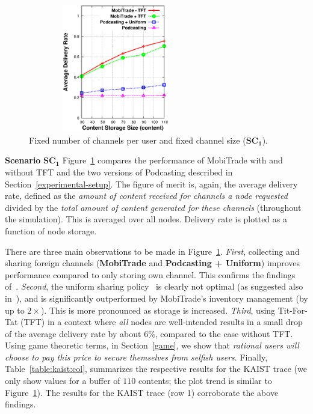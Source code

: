 \begin{figure}[!h]
  \begin{center}
    \includegraphics[width=3in,height=2.2in]{Chapitre5/fig5.eps}
  \end{center}
  \caption{Fixed number of channels per user and fixed channel size ($\mathbf{SC_1}$).}
  \label{CS+FNC+FCS}
\end{figure}

\textbf{Scenario} $\mathbf{SC_{1}}$ Figure~\ref{CS+FNC+FCS} compares the performance of MobiTrade with and without TFT and the two versions of Podcasting described in Section~\ref{experimental-setup}. The figure of merit is, again, the average delivery rate, defined as the \emph{amount of content received for channels a node requested} divided by the \emph{total amount of content generated for these channels} (throughout the simulation). This is averaged over all nodes. Delivery rate is plotted as a function of node storage.

There are three main observations to be made in Figure~\ref{CS+FNC+FCS}. \emph{First}, collecting and sharing foreign channels (\textbf{MobiTrade} and \textbf{Podcasting + Uniform}) improves performance compared to only storing own channel. This confirms the findings of~\cite{Podcasting:Secon07}. \emph{Second}, the uniform sharing policy~\cite{Podcasting:Secon07} is clearly not optimal (as suggested also in~\cite{OptimalChannelChoice}), and is significantly outperformed by MobiTrade's inventory management (by up to $2 \times$). This is more pronounced as storage is increased. \emph{Third}, using Tit-For-Tat (TFT) in a context where \emph{all} nodes are well-intended results in a small drop of the average delivery rate by about $6\%$, compared to the case without TFT. Using game theoretic terms, in Section~\ref{game}, we show that \emph{rational users will choose to pay this price to secure themselves from selfish users}. Finally, Table~\ref{table:kaist:col}, summarizes the respective results for the KAIST trace (we only show values for a buffer of $110$ contents; the plot trend is similar to Figure~\ref{CS+FNC+FCS}). The results for the KAIST trace (row 1) corroborate the above findings.

